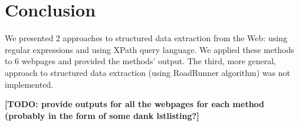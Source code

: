 \documentclass[9pt]{IEEEtran}
\begin{document}
\section{Conclusion}
\label{section:conclusion}

We presented 2 approaches to structured data extraction from the Web: using regular expressions and using XPath query language.
We applied these methods to 6 webpages and provided the methods' output.
The third, more general, approach to structured data extraction (using RoadRunner algorithm) was not implemented.




\textbf{[TODO: provide outputs for all the webpages for each method (probably in the form of some dank lstlisting?]}
\end{document}
